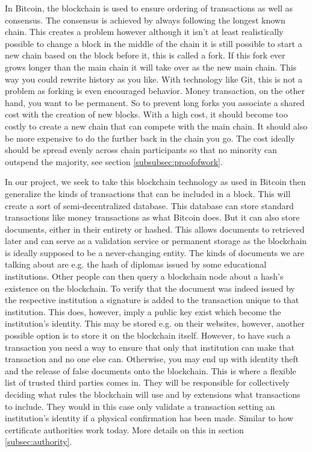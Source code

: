 \documentclass[11pt]{article}
\begin{document}

In Bitcoin, the blockchain is used to ensure ordering of transactions as well as consensus. The consensus is achieved by always following the longest known chain. This creates a problem however although it isn't at least realistically possible to change a block in the middle of the chain it is still possible to start a new chain based on the block before it, this is called a fork. If this fork ever grows longer than the main chain it will take over as the new main chain. This way you could rewrite history as you like. With technology like Git, this is not a problem as forking is even encouraged behavior. Money transaction, on the other hand, you want to be permanent. So to prevent long forks you associate a shared cost with the creation of new blocks. With a high cost, it should become too costly to create a new chain that can compete with the main chain. It should also be more expensive to do the further back in the chain you go. The cost ideally should be spread evenly across chain participants so that no minority can outspend the majority, see section \ref{subsubsec:proofofwork}.

In our project, we seek to take this blockchain technology as used in Bitcoin then generalize the kinds of transactions that can be included in a block. This will create a sort of semi-decentralized database. This database can store standard transactions like money transactions as what Bitcoin does. But it can also store documents, either in their entirety or hashed. This allows documents to retrieved later and can serve as a validation service or permanent storage as the blockchain is ideally supposed to be a never-changing entity. The kinds of documents we are talking about are e.g. the hash of diplomas issued by some educational institutions. Other people can then query a blockchain node about a hash's existence on the blockchain. To verify that the document was indeed issued by the respective institution a signature is added to the transaction unique to that institution. This does, however, imply a public key exist which become the institution's identity. This may be stored e.g. on their websites, however, another possible option is to store it on the blockchain itself. However, to have such a transaction you need a way to ensure that only that institution can make that transaction and no one else can. Otherwise, you may end up with identity theft and the release of false documents onto the blockchain. This is where a flexible list of trusted third parties comes in. They will be responsible for collectively deciding what rules the blockchain will use and by extensions what transactions to include. They would in this case only validate a transaction setting an institution's identity if a physical confirmation has been made. Similar to how certificate authorities work today. More details on this in section \ref{subsec:authority}.
\end{document}
